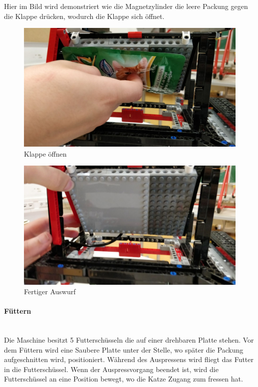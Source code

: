 \documentclass[a4paper,12pt]{scrartcl}
\begin{document}
Hier im Bild wird demonstriert wie die Magnetzylinder die leere Packung gegen die Klappe drücken, wodurch die Klappe sich öffnet.

\begin{figure}[H]
\begin{center}
\includegraphics[width=13cm]{Bilder/Ablauf_1_png/Auswurf_4}
\caption{Klappe öffnen}
\end{center}
\end{figure}

\begin{figure}[H]
\begin{center}
\includegraphics[width=13cm]{Bilder/Ablauf_1_png/Auswurf_5}
\caption{Fertiger Auswurf}
\end{center}
\end{figure}

\paragraph{Füttern}$~~$\\ 

Die Maschine besitzt 5 Futterschüsseln die auf einer drehbaren Platte stehen. Vor dem Füttern wird eine Saubere Platte unter der Stelle, wo später die Packung aufgeschnitten wird, positioniert. Während des Auspressens wird fliegt das Futter in die Futterschüssel. Wenn der Auspressvorgang beendet ist, wird die Futterschüssel an eine Position bewegt, wo die Katze Zugang zum fressen hat.
\newpage
\end{document}
